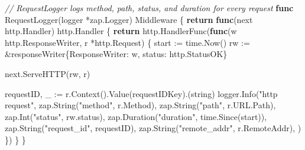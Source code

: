 \documentclass[
]{article}
\newenvironment{Shaded}{}{}
\newcommand{\CommentTok}[1]{\textcolor[rgb]{0.38,0.63,0.69}{\textit{#1}}}
\newcommand{\ControlFlowTok}[1]{\textcolor[rgb]{0.00,0.44,0.13}{\textbf{#1}}}
\newcommand{\DataTypeTok}[1]{\textcolor[rgb]{0.56,0.13,0.00}{#1}}
\newcommand{\KeywordTok}[1]{\textcolor[rgb]{0.00,0.44,0.13}{\textbf{#1}}}
\newcommand{\NormalTok}[1]{#1}
\newcommand{\OperatorTok}[1]{\textcolor[rgb]{0.40,0.40,0.40}{#1}}
\newcommand{\StringTok}[1]{\textcolor[rgb]{0.25,0.44,0.63}{#1}}
\begin{document}
\begin{Shaded}
\begin{Highlighting}[]
\CommentTok{// RequestLogger logs method, path, status, and duration for every request}
\KeywordTok{func}\NormalTok{ RequestLogger}\OperatorTok{(}\NormalTok{logger }\OperatorTok{*}\NormalTok{zap}\OperatorTok{.}\NormalTok{Logger}\OperatorTok{)}\NormalTok{ Middleware }\OperatorTok{\{}
    \ControlFlowTok{return} \KeywordTok{func}\OperatorTok{(}\NormalTok{next http}\OperatorTok{.}\NormalTok{Handler}\OperatorTok{)}\NormalTok{ http}\OperatorTok{.}\NormalTok{Handler }\OperatorTok{\{}
        \ControlFlowTok{return}\NormalTok{ http}\OperatorTok{.}\NormalTok{HandlerFunc}\OperatorTok{(}\KeywordTok{func}\OperatorTok{(}\NormalTok{w http}\OperatorTok{.}\NormalTok{ResponseWriter}\OperatorTok{,}\NormalTok{ r }\OperatorTok{*}\NormalTok{http}\OperatorTok{.}\NormalTok{Request}\OperatorTok{)} \OperatorTok{\{}
\NormalTok{            start }\OperatorTok{:=}\NormalTok{ time}\OperatorTok{.}\NormalTok{Now}\OperatorTok{()}
\NormalTok{            rw }\OperatorTok{:=} \OperatorTok{\&}\NormalTok{responseWriter}\OperatorTok{\{}\NormalTok{ResponseWriter}\OperatorTok{:}\NormalTok{ w}\OperatorTok{,}\NormalTok{ status}\OperatorTok{:}\NormalTok{ http}\OperatorTok{.}\NormalTok{StatusOK}\OperatorTok{\}}

\NormalTok{            next}\OperatorTok{.}\NormalTok{ServeHTTP}\OperatorTok{(}\NormalTok{rw}\OperatorTok{,}\NormalTok{ r}\OperatorTok{)}

\NormalTok{            requestID}\OperatorTok{,}\NormalTok{ \_ }\OperatorTok{:=}\NormalTok{ r}\OperatorTok{.}\NormalTok{Context}\OperatorTok{().}\NormalTok{Value}\OperatorTok{(}\NormalTok{requestIDKey}\OperatorTok{).(}\DataTypeTok{string}\OperatorTok{)}
\NormalTok{            logger}\OperatorTok{.}\NormalTok{Info}\OperatorTok{(}\StringTok{"http request"}\OperatorTok{,}
\NormalTok{                zap}\OperatorTok{.}\NormalTok{String}\OperatorTok{(}\StringTok{"method"}\OperatorTok{,}\NormalTok{ r}\OperatorTok{.}\NormalTok{Method}\OperatorTok{),}
\NormalTok{                zap}\OperatorTok{.}\NormalTok{String}\OperatorTok{(}\StringTok{"path"}\OperatorTok{,}\NormalTok{ r}\OperatorTok{.}\NormalTok{URL}\OperatorTok{.}\NormalTok{Path}\OperatorTok{),}
\NormalTok{                zap}\OperatorTok{.}\NormalTok{Int}\OperatorTok{(}\StringTok{"status"}\OperatorTok{,}\NormalTok{ rw}\OperatorTok{.}\NormalTok{status}\OperatorTok{),}
\NormalTok{                zap}\OperatorTok{.}\NormalTok{Duration}\OperatorTok{(}\StringTok{"duration"}\OperatorTok{,}\NormalTok{ time}\OperatorTok{.}\NormalTok{Since}\OperatorTok{(}\NormalTok{start}\OperatorTok{)),}
\NormalTok{                zap}\OperatorTok{.}\NormalTok{String}\OperatorTok{(}\StringTok{"request\_id"}\OperatorTok{,}\NormalTok{ requestID}\OperatorTok{),}
\NormalTok{                zap}\OperatorTok{.}\NormalTok{String}\OperatorTok{(}\StringTok{"remote\_addr"}\OperatorTok{,}\NormalTok{ r}\OperatorTok{.}\NormalTok{RemoteAddr}\OperatorTok{),}
            \OperatorTok{)}
        \OperatorTok{\})}
    \OperatorTok{\}}
\OperatorTok{\}}


\end{Highlighting}
\end{Shaded}
\end{document}
